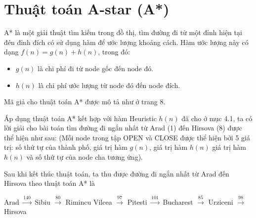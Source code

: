 \documentclass[a4paper, 11pt]{article}
\begin{document}
\section{Thuật toán A-star (A*)}
A* là một giải thuật tìm kiếm trong đồ thị, tìm đường đi từ một đỉnh hiện tại đén đỉnh đích có sử dụng hàm để ước lượng khoảng cách. Hàm ước lượng này có dạng $f(n) = g(n) + h(n)$, trong đó:
\begin{itemize}
  \item $g(n)$ là chi phí đi từ node gốc đến node đó.
  \item $h(n)$ là chi phí ước lượng từ node đó đến node đích.
\end{itemize}
Mã giả cho thuật toán A* được mô tả như ở trang 8. 

Áp dụng thuật toán A* kết hợp với hàm Heuristic $h(n)$ đã cho ở mục 4.1, ta có lời giải cho bài toán tìm đường đi ngắn nhất từ Arad (1) đến Hirsova (8) được thể hiện như sau: (Mỗi node trong tập OPEN và CLOSE được thể hiện bởi 5 giá trị: số thứ tự của thành phố, giá trị hàm $g(n)$, giá trị hàm $h(n)$ giá trị hàm $h(n)$ và số thứ tự của node cha tương ứng).

Sau khi kết thúc thuật toán, ta thu được đường đi ngắn nhất từ Arad đến Hirsova theo thuật toán A* là
\begin{center}
  Arad $\xrightarrow{140}$ Sibiu $\xrightarrow{80}$ Rimincu Vilcea $\xrightarrow{97}$ Pitesti $\xrightarrow{101}$ Bucharest $\xrightarrow{85}$ Urziceni $\xrightarrow{98}$ Hirsova
\end{center}
\end{document}

